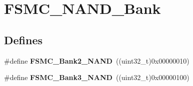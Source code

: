 \hypertarget{group__FSMC__NAND__Bank}{
\section{FSMC\_\-NAND\_\-Bank}
\label{group__FSMC__NAND__Bank}
}
\subsection*{Defines}
\begin{DoxyCompactItemize}
\item 
\hypertarget{group__FSMC__NAND__Bank_ga294e7134aa329a09e56b61eec9882a27}{
\#define {\bfseries FSMC\_\-Bank2\_\-NAND}~((uint32\_\-t)0x00000010)}
\label{group__FSMC__NAND__Bank_ga294e7134aa329a09e56b61eec9882a27}

\item 
\hypertarget{group__FSMC__NAND__Bank_gaf72def0732c026b0245d721ee371c85b}{
\#define {\bfseries FSMC\_\-Bank3\_\-NAND}~((uint32\_\-t)0x00000100)}
\label{group__FSMC__NAND__Bank_gaf72def0732c026b0245d721ee371c85b}

\end{DoxyCompactItemize}
